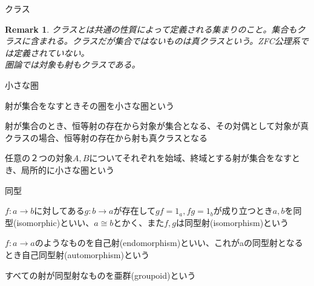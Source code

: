 \documentclass[unicode,12pt,aspectratio=169]{beamer}
\newtheorem*{remark}{Remark}
\begin{document}
\begin{frame}{クラス}
    \begin{tcolorbox}
        \begin{remark}
            クラスとは共通の性質によって定義される集まりのこと。集合もクラスに含まれる。クラスだが集合ではないものは真クラスという。ZFC公理系では定義されていない。\\
            圏論では対象も射もクラスである。
        \end{remark}
    \end{tcolorbox}
\end{frame}
\begin{frame}{小さな圏}
    \begin{tcolorbox}
        \begin{definition}
            射が集合をなすときその圏を小さな圏という
        \end{definition}
        \begin{theorem}
            射が集合のとき、恒等射の存在から対象が集合となる、その対偶として対象が真クラスの場合、恒等射の存在から射も真クラスとなる
        \end{theorem}
        \begin{definition}
            任意の２つの対象$A,B$についてそれぞれを始域、終域とする射が集合をなすとき、局所的に小さな圏という
        \end{definition}
    \end{tcolorbox}
\end{frame}
\begin{frame}{同型}
    \begin{tcolorbox}
        \begin{definition}
            $f:a \rightarrow b$に対してある$g:b \rightarrow a$が存在して$gf=1_a , fg=1_b$が成り立つとき$a,b$を同型(isomorphic)といい、$a \cong b$とかく、また$f,g$は同型射(isomorphism)という
        \end{definition}
        \begin{definition}
            $f:a \rightarrow a$のようなものを自己射(endomorphism)といい、これがaの同型射となるとき自己同型射(automorphism)という
        \end{definition}
        \begin{definition}
            すべての射が同型射なものを亜群(groupoid)という
        \end{definition}
    \end{tcolorbox}
\end{frame}
\end{document}
